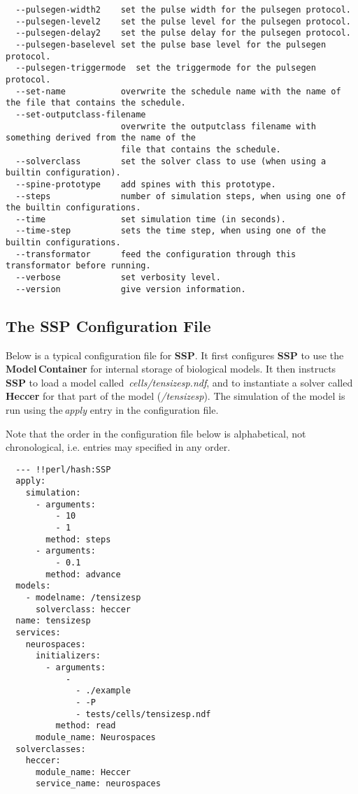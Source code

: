 \documentclass[12pt]{article}
\begin{document}
\begin{verbatim}
  --pulsegen-width2    set the pulse width for the pulsegen protocol.
  --pulsegen-level2    set the pulse level for the pulsegen protocol.
  --pulsegen-delay2    set the pulse delay for the pulsegen protocol.
  --pulsegen-baselevel set the pulse base level for the pulsegen protocol.
  --pulsegen-triggermode  set the triggermode for the pulsegen protocol.
  --set-name           overwrite the schedule name with the name of the file that contains the schedule.
  --set-outputclass-filename
                       overwrite the outputclass filename with something derived from the name of the
                       file that contains the schedule.
  --solverclass        set the solver class to use (when using a builtin configuration).
  --spine-prototype    add spines with this prototype.
  --steps              number of simulation steps, when using one of the builtin configurations.
  --time               set simulation time (in seconds).
  --time-step          sets the time step, when using one of the builtin configurations.
  --transformator      feed the configuration through this transformator before running.
  --verbose            set verbosity level.
  --version            give version information.
\end{verbatim}



\subsection*{The SSP Configuration File}

Below is a typical configuration file for {\bf SSP}. It first configures {\bf SSP} to use the\,{\bf Model\,Container} for internal storage of biological models. It then instructs {\bf SSP} to load a model called \,{\it cells/tensizesp.ndf}, and to instantiate a solver called\,{\bf Heccer} for that part of the model ({\it /tensizesp}). The simulation of the model is run using the\,{\it apply} entry in the configuration file.

Note that the order in the configuration file below is alphabetical, not chronological, i.e. entries may specified in any order.

\begin{verbatim}
  --- !!perl/hash:SSP
  apply:
    simulation:
      - arguments:
          - 10
          - 1
        method: steps
      - arguments:
          - 0.1
        method: advance
  models:
    - modelname: /tensizesp
      solverclass: heccer
  name: tensizesp
  services:
    neurospaces:
      initializers:
        - arguments:
            -
              - ./example
              - -P
              - tests/cells/tensizesp.ndf
          method: read
      module_name: Neurospaces
  solverclasses:
    heccer:
      module_name: Heccer
      service_name: neurospaces
\end{verbatim}
\end{document}
